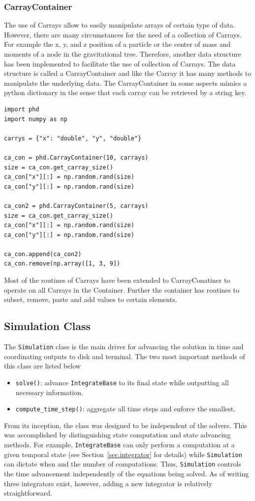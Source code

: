 \subsubsection{CarrayContainer}
\label{sec.carraycontainer}
The use of Carrays allow to easily manipulate arrays of certain type of data. However, there are
many circumstances for the need of a collection of Carrays. For example the x, y, and z position
of a particle or the center of mass and moments of a node in the gravitational tree. Therefore,
another data structure has been implemented to facilitate the use of collection of Carrays. The data
structure is called a CarrayContainer and like the Carray it has many methods to manipulate the
underlying data. The CarrayContainer in some aspects mimics a python dictionary in the sense
that each carray can be retrieved by a string key.
\begin{lstlisting}
import phd
import numpy as np

carrys = {"x": "double", "y", "double"}

ca_con = phd.CarrayContainer(10, carrays)
size = ca_con.get_carray_size()
ca_con["x"][:] = np.random.rand(size)
ca_con["y"][:] = np.random.rand(size)

ca_con2 = phd.CarrayContainer(5, carrays)
size = ca_con.get_carray_size()
ca_con["x"][:] = np.random.rand(size)
ca_con["y"][:] = np.random.rand(size)

ca_con.append(ca_con2)
ca_con.remove(np.array([1, 3, 9])
\end{lstlisting}
Most of the routines of Carrays have been extended to CarrayConatiner to operate on
all Carrays in the Container. Further the container has routines to subset, remove, paste
and add values to certain elements.

\subsection{Simulation Class}
The \lstinline{Simulation} class is the main driver for advancing the solution in time
and coordinating outputs to disk and terminal. The two most important methods of this
class are listed below
\begin{itemize}
    \item \lstinline{solve()}: advance \lstinline{IntegrateBase} to its final state while
        outputting all necessary information. 
    \item \lstinline{compute_time_step()}: aggregate all time steps and enforce the smallest.
\end{itemize}
From its inception, the class was designed to be independent of the solvers. This was 
accomplished by distinguishing state computation and state advancing methods. For example,
\lstinline{IntegrateBase} can only perform a computation at a given temporal state 
(see Section~\ref{sec.integrator} for details) while \lstinline{Simulation} can
dictate when and the number of computations. Thus, \lstinline{Simulation} controls the
time advancement independently of the equations being solved. As of writing three integrators
exist, however, adding a new integrator is relatively straightforward.

